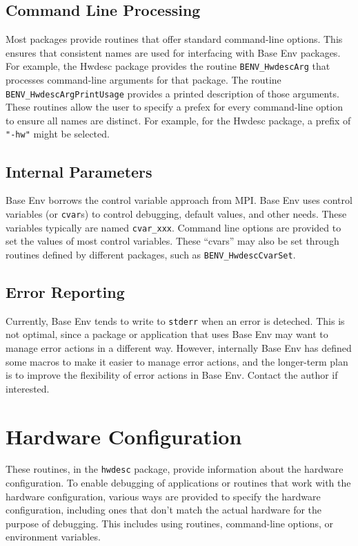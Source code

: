 \documentclass[11pt,letterpaper]{report}
\begin{document}
\section{Command Line Processing}
Most packages provide routines that offer standard command-line
options.
This ensures that consistent names are used for interfacing with Base
Env packages.
For example, the Hwdesc package provides the routine
\texttt{BENV\_HwdescArg} that processes command-line arguments for that
package.
The routine \texttt{BENV\_HwdescArgPrintUsage} provides a printed
description of those arguments.
These routines allow the user to specify a prefex for every
command-line option to ensure all names are distinct.
For example, for the Hwdesc package, a prefix of \texttt{"-hw"} might
be selected.

\section{Internal Parameters}
Base Env borrows the control variable approach from MPI. Base Env
uses control variables (or \texttt{cvar}s) to control debugging,
default values, and other needs.
These variables typically are named \texttt{cvar\_xxx}.
Command line options are provided to set the values of most control
variables.
These ``cvars'' may also be set through routines defined by different
packages, such as \texttt{BENV\_HwdescCvarSet}.

\section{Error Reporting}
Currently, Base Env tends to write to \texttt{stderr} when an error is
deteched.
This is not optimal, since a package or application that uses Base Env
may want to manage error actions in a different way.
However, internally Base Env has defined some macros to make it easier
to manage error actions, and the longer-term plan is to improve the
flexibility of error actions in Base Env. Contact the author if interested.

\chapter{Hardware Configuration}

These routines, in the \texttt{hwdesc} package, provide information
about the hardware configuration.
To enable debugging of applications or routines that work with the
hardware configuration, various ways are provided to specify the hardware
configuration, including ones that don't match the actual hardware for
the purpose of debugging. This includes using routines, command-line options, or
environment variables.
\end{document}
